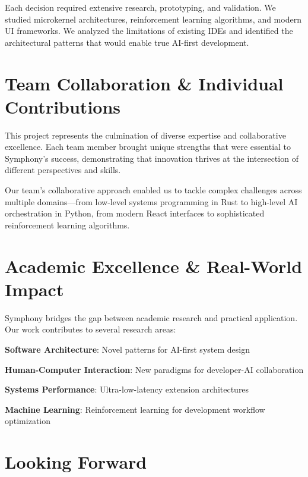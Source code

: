 Each decision required extensive research, prototyping, and validation. We studied microkernel architectures, reinforcement learning algorithms, and modern UI frameworks. We analyzed the limitations of existing IDEs and identified the architectural patterns that would enable true AI-first development.

\section*{Team Collaboration \& Individual Contributions}

\begin{successbox}
This project represents the culmination of diverse expertise and collaborative excellence. Each team member brought unique strengths that were essential to Symphony's success, demonstrating that innovation thrives at the intersection of different perspectives and skills.
\end{successbox}

Our team's collaborative approach enabled us to tackle complex challenges across multiple domains—from low-level systems programming in Rust to high-level AI orchestration in Python, from modern React interfaces to sophisticated reinforcement learning algorithms.

\section*{Academic Excellence \& Real-World Impact}

Symphony bridges the gap between academic research and practical application. Our work contributes to several research areas:

\begin{compactlist}
    \item \textbf{Software Architecture}: Novel patterns for AI-first system design
    \item \textbf{Human-Computer Interaction}: New paradigms for developer-AI collaboration
    \item \textbf{Systems Performance}: Ultra-low-latency extension architectures
    \item \textbf{Machine Learning}: Reinforcement learning for development workflow optimization
\end{compactlist}

\section*{Looking Forward}

